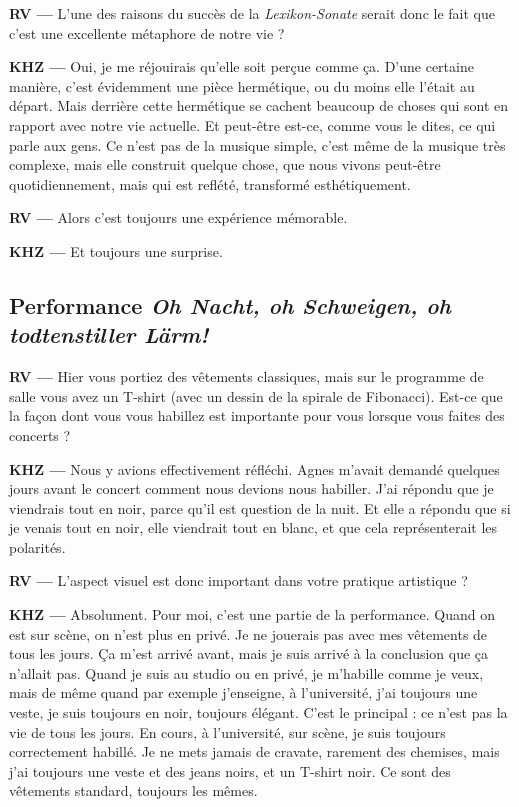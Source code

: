 \documentclass[a4paper,12pt]{article}
\begin{document}
\textbf{RV ---} L'une des raisons du succès de la \emph{Lexikon-Sonate} serait donc le fait que c'est une excellente métaphore de notre vie ?

\textbf{KHZ ---} Oui, je me réjouirais qu'elle soit perçue comme ça. D'une certaine manière, c'est évidemment une pièce hermétique, ou du moins elle l'était au départ. Mais derrière cette hermétique se cachent beaucoup de choses qui sont en rapport avec notre vie actuelle. Et peut-être est-ce, comme vous le dites, ce qui parle aux gens. Ce n'est pas de la musique simple, c'est même de la musique très complexe, mais elle construit quelque chose, que nous vivons peut-être quotidiennement, mais qui est reflété, transformé esthétiquement.

\textbf{RV ---} Alors c'est toujours une expérience mémorable.

\textbf{KHZ ---} Et toujours une surprise.


\subsection{Performance \emph{Oh Nacht, oh Schweigen, oh todtenstiller Lärm!}}

\textbf{RV ---} Hier vous portiez des vêtements classiques, mais sur le programme de salle vous avez un T-shirt (avec un dessin de la spirale de Fibonacci). Est-ce que la façon dont vous vous habillez est importante pour vous lorsque vous faites des concerts ?

\textbf{KHZ ---} Nous y avions effectivement réfléchi. Agnes m'avait demandé quelques jours avant le concert comment nous devions nous habiller. J'ai répondu que je viendrais tout en noir, parce qu'il est question de la nuit. Et elle a répondu que si je venais tout en noir, elle viendrait tout en blanc, et que cela représenterait les polarités.

\textbf{RV ---} L'aspect visuel est donc important dans votre pratique artistique ?

\textbf{KHZ ---} Absolument. Pour moi, c'est une partie de la performance. Quand on est sur scène, on n'est plus en privé. Je ne jouerais pas avec mes vêtements de tous les jours. Ça m'est arrivé avant, mais je suis arrivé à la conclusion que ça n'allait pas. Quand je suis au studio ou en privé, je m'habille comme je veux, mais de même quand par exemple j'enseigne, à l'université, j'ai toujours une veste, je suis toujours en noir, toujours élégant. C'est le principal : ce n'est pas la vie de tous les jours. En cours, à l'université, sur scène, je suis toujours correctement habillé. Je ne mets jamais de cravate, rarement des chemises, mais j'ai toujours une veste et des jeans noirs, et un T-shirt noir. Ce sont des vêtements standard, toujours les mêmes.
\end{document}
